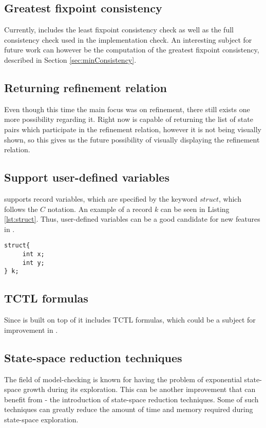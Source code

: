\subsection{Greatest fixpoint consistency}
Currently, \jecdar includes the least fixpoint consistency check as well as the full consistency check used in the implementation check. An interesting subject for future work can however be the computation of the greatest fixpoint consistency, described in Section \ref{sec:minConsistency}.

\subsection{Returning refinement relation}
Even though this time the main focus was on refinement, there still exists one more possibility regarding it. Right now \jecdar is capable of returning the list of state pairs which participate in the refinement relation, however it is not being visually shown, so this gives us the future possibility of visually displaying the refinement relation.

\subsection{Support user-defined variables}
 supports record variables, which are specified by the keyword $struct$, which follows the $C$ notation. An example of a record $k$ can be seen in Listing \ref{lst:struct}. Thus, user-defined variables can be a good candidate for new features in \jecdar.
\begin{lstlisting}[caption={Record example},label={lst:struct}, captionpos=b]
struct{
     int x;
     int y;
} k;         
\end{lstlisting}

\subsection{TCTL formulas}
Since  is built on top of \uppaal it includes TCTL formulas, which could be a subject for improvement in \jecdar. 

\subsection{State-space reduction techniques}
The field of model-checking is known for having the problem of exponential state-space growth during its exploration.
This can be another improvement that \jecdar can benefit from - the introduction of state-space reduction techniques. Some of such techniques can greatly reduce the amount of time and memory required during state-space exploration.

